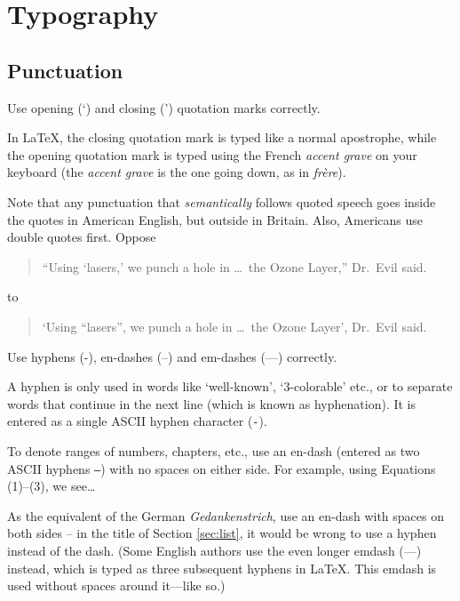 \newcommand{\package}{\emph}

\chapter{Typography}


\section{Punctuation}

\begin{Rule}
  Use opening (`) and closing (') quotation marks correctly.
\end{Rule}

In \LaTeX, the closing quotation mark is typed like a normal
apostrophe, while the opening quotation mark is typed using the French
\emph{accent grave} on your keyboard (the \emph{accent grave} is the
one going down, as in \emph{frère}).

Note that any punctuation that \emph{semantically} follows quoted
speech goes inside the quotes in American English, but outside in
Britain.  Also, Americans use double quotes first.  Oppose
\begin{quote}
  ``Using `lasers,' we punch a hole in \ldots\ the Ozone Layer,''
  Dr.\ Evil said.
\end{quote}
to
\begin{quote}
  `Using ``lasers'', we punch a hole in \ldots\ the Ozone Layer',
  Dr.\ Evil said.
\end{quote}

\begin{Rule}
  Use hyphens (-), en-dashes (--) and em-dashes (---) correctly.
\end{Rule}

A hyphen is only used in words like `well-known', `$3$-colorable'
etc., or to separate words that continue in the next line (which is
known as hyphenation).  It is entered as a single ASCII hyphen
character (\texttt{-}).

To denote ranges of numbers, chapters, etc., use an en-dash (entered
as two ASCII hyphens \texttt{--}) with no spaces on either side.  For
example, using Equations (1)--(3), we see\ldots

As the equivalent of the German \emph{Gedankenstrich}, use an en-dash
with spaces on both sides -- in the title of Section \ref{sec:list},
it would be wrong to use a hyphen instead of the dash. (Some English
authors use the even longer emdash (---) instead, which is typed as
three subsequent hyphens in \LaTeX. This emdash is used without spaces
around it---like so.)


